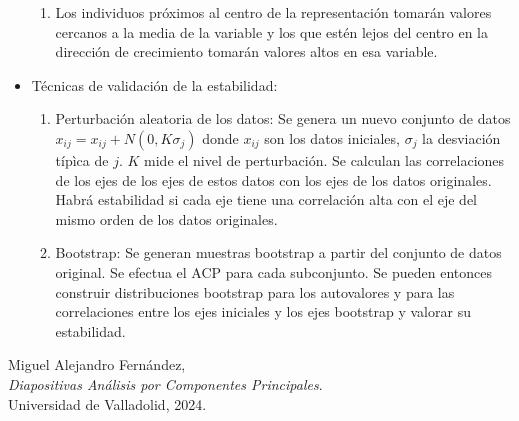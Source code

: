 \documentclass{article}
\begin{document}
\begin{itemize}
\begin{enumerate}
              \item Los individuos próximos al centro de la representación tomarán valores cercanos a la media de la variable y los que estén lejos del centro en la dirección de crecimiento tomarán valores altos en esa variable.
          \end{enumerate}
    \item Técnicas de validación de la estabilidad:
          \begin{enumerate}
              \item Perturbación aleatoria de los datos: Se genera un nuevo conjunto de datos $x_{ij}=x_{ij}+N(0,K\sigma_j)$ donde $x_{ij}$ son los datos iniciales, $\sigma_j$ la desviación típìca de $j$. $K$ mide el nivel de perturbación. Se calculan las correlaciones de los ejes de los ejes de estos datos con los ejes de los datos originales. Habrá estabilidad si cada eje tiene una correlación alta con el eje del mismo orden de los datos originales.
              \item  Bootstrap: Se generan muestras bootstrap a partir del conjunto de datos original. Se efectua el ACP para cada subconjunto. Se pueden entonces construir distribuciones bootstrap para los autovalores y para las correlaciones entre los ejes iniciales y los ejes bootstrap y valorar su estabilidad.
          \end{enumerate}
\end{itemize}

\newpage


\begin{thebibliography}{9}
    Miguel Alejandro Fernández, \\ \textit{Diapositivas Análisis por Componentes Principales}. \\ Universidad de Valladolid, 2024.
\end{thebibliography}

% 
% 

\end{document}
